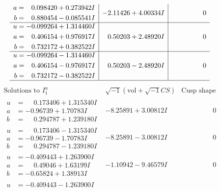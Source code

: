 \documentclass[1p]{elsarticle_modified}
\theoremstyle{definition}
\newcommand{\I}{\sqrt{-1}}
\begin{document}
$$\begin{array}{c|c|c}
\begin{aligned}
a &= \phantom{-}0.098420 + 0.273942 I \\
b &= \phantom{-}0.880454 - 0.085541 I\end{aligned}
 & -2.11426 + 4.00334 I & \phantom{-0.000000 } 0 \\ \hline\begin{aligned}
u &= -0.099264 + 1.314460 I \\
a &= \phantom{-}0.406154 + 0.976917 I \\
b &= \phantom{-}0.732172 + 0.382522 I\end{aligned}
 & \phantom{-}0.50203 + 2.48920 I & \phantom{-0.000000 } 0 \\ \hline\begin{aligned}
u &= -0.099264 - 1.314460 I \\
a &= \phantom{-}0.406154 - 0.976917 I \\
b &= \phantom{-}0.732172 - 0.382522 I\end{aligned}
 & \phantom{-}0.50203 - 2.48920 I & \phantom{-0.000000 } 0\\
 \hline 
 \end{array}$$\newpage$$\begin{array}{c|c|c}  
\text{Solutions to }I^u_{1}& \I (\text{vol} + \sqrt{-1}CS) & \text{Cusp shape}\\
 \hline 
\begin{aligned}
u &= \phantom{-}0.173406 + 1.315340 I \\
a &= -0.96739 + 1.70783 I \\
b &= \phantom{-}0.294787 + 1.239180 I\end{aligned}
 & -8.25891 + 3.00812 I & \phantom{-0.000000 } 0 \\ \hline\begin{aligned}
u &= \phantom{-}0.173406 - 1.315340 I \\
a &= -0.96739 - 1.70783 I \\
b &= \phantom{-}0.294787 - 1.239180 I\end{aligned}
 & -8.25891 - 3.00812 I & \phantom{-0.000000 } 0 \\ \hline\begin{aligned}
u &= -0.409443 + 1.263900 I \\
a &= \phantom{-}0.49046 + 1.63199 I \\
b &= -0.65824 + 1.38913 I\end{aligned}
 & -1.10942 - 9.46579 I & \phantom{-0.000000 } 0 \\ \hline\begin{aligned}
u &= -0.409443 - 1.263900 I \\

\end{aligned}
\end{array}$$
\end{document}
